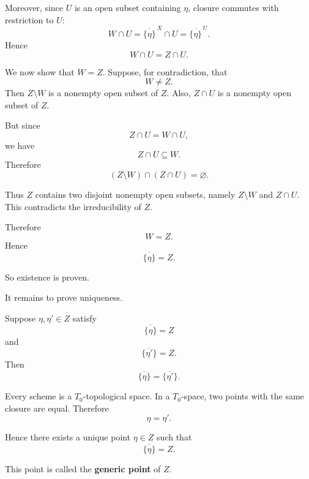 Moreover, since \(U\) is an open subset containing \(\eta\), closure commutes with restriction to \(U\):
\[
W\cap U
=
\overline{\{\eta\}}^{\,X}\cap U
=
\overline{\{\eta\}}^{\,U}.
\]
Hence
\[
W\cap U=Z\cap U.
\]

We now show that \(W=Z\). Suppose, for contradiction, that
\[
W\neq Z.
\]
Then \(Z\setminus W\) is a nonempty open subset of \(Z\). Also, \(Z\cap U\) is a nonempty open subset of \(Z\).

But since
\[
Z\cap U=W\cap U,
\]
we have
\[
Z\cap U\subseteq W.
\]
Therefore
\[
(Z\setminus W)\cap (Z\cap U)=\varnothing.
\]

Thus \(Z\) contains two disjoint nonempty open subsets, namely \(Z\setminus W\) and \(Z\cap U\). This contradicts the irreducibility of \(Z\).

Therefore
\[
W=Z.
\]
Hence
\[
\overline{\{\eta\}}=Z.
\]

So existence is proven.

It remains to prove uniqueness.

Suppose \(\eta,\eta'\in Z\) satisfy
\[
\overline{\{\eta\}}=Z
\]
and
\[
\overline{\{\eta'\}}=Z.
\]
Then
\[
\overline{\{\eta\}}=\overline{\{\eta'\}}.
\]

Every scheme is a \(T_0\)-topological space. In a \(T_0\)-space, two points with the same closure are equal. Therefore
\[
\eta=\eta'.
\]

Hence there exists a unique point \(\eta\in Z\) such that
\[
\boxed{\overline{\{\eta\}}=Z.}
\]

This point is called the \textbf{generic point} of \(Z\).

\newpage
